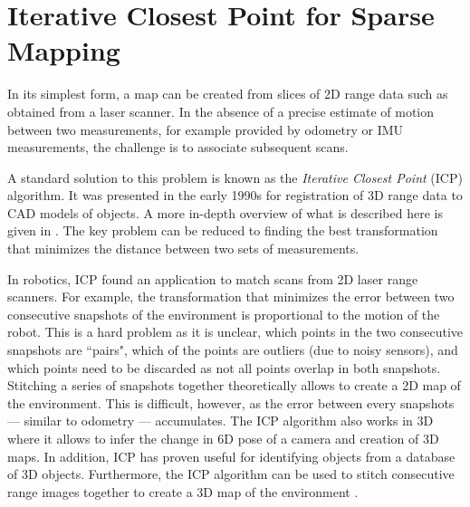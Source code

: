 \section{Iterative Closest Point for Sparse Mapping}
In its simplest form, a map can be created from slices of 2D range data such as obtained from a laser scanner. In the absence of a precise estimate of motion between two measurements, for example provided by odometry or IMU measurements, the challenge is to associate subsequent scans. 

A standard solution to this problem is known as the \emph{Iterative Closest Point} (ICP) algorithm. It was presented in the early 1990s for registration of 3D range data to CAD models of objects. A more in-depth overview of what is described here is given in \cite{rusinkiewicz01}. The key problem can be reduced to finding the best transformation that minimizes the distance between two sets of measurements.

In robotics, ICP found an application to match scans from 2D laser range
scanners. For example, the transformation that minimizes the error between two
consecutive snapshots of the environment is proportional to the motion of the
robot. This is a hard problem as it is unclear, which points in the two
consecutive snapshots are ``pairs", which of the points are outliers (due to
noisy sensors), and which points need to be discarded as not all points overlap
in both snapshots. Stitching a series of snapshots together theoretically
allows to create a 2D map of the environment. This is difficult, however, as
the error between every snapshots --- similar to odometry --- accumulates.
The ICP algorithm also works in 3D where it allows to infer the change in 6D
pose of a camera and creation of 3D maps. In addition, ICP has proven useful
for identifying objects from a database of 3D objects. Furthermore, the ICP
algorithm can be used to stitch consecutive range images together to create a
3D map of the environment \cite{henry2010rgb}. 

